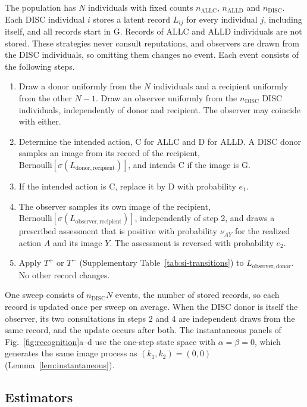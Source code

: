 \documentclass[10pt]{wlscirep}
\newcommand{\ALLC}{\mathrm{ALLC}}
\newcommand{\ALLD}{\mathrm{ALLD}}
\newcommand{\DISC}{\mathrm{DISC}}
\theoremstyle{plain}
\theoremstyle{remark}
\begin{document}
The population has $N$ individuals with fixed counts $n_{\ALLC}$, $n_{\ALLD}$ and $n_{\DISC}$. Each DISC individual $i$ stores a latent record $L_{ij}$ for every individual $j$, including itself, and all records start in G. Records of ALLC and ALLD individuals are not stored. These strategies never consult reputations, and observers are drawn from the DISC individuals, so omitting them changes no event. Each event consists of the following steps.
\begin{enumerate}
\item Draw a donor uniformly from the $N$ individuals and a recipient uniformly from the other $N-1$. Draw an observer uniformly from the $n_{\DISC}$ DISC individuals, independently of donor and recipient. The observer may coincide with either.
\item Determine the intended action, C for ALLC and D for ALLD. A DISC donor samples an image from its record of the recipient, $\mathrm{Bernoulli}[\sigma(L_{\mathrm{donor,recipient}})]$, and intends C if the image is G.
\item If the intended action is C, replace it by D with probability $e_1$.
\item The observer samples its own image of the recipient, $\mathrm{Bernoulli}[\sigma(L_{\mathrm{observer,recipient}})]$, independently of step 2, and draws a prescribed assessment that is positive with probability $\nu_{AY}$ for the realized action $A$ and its image $Y$. The assessment is reversed with probability $e_2$.
\item Apply $T^+$ or $T^-$ (Supplementary Table~\ref{tab:si-transitions}) to $L_{\mathrm{observer,donor}}$. No other record changes.
\end{enumerate}
One sweep consists of $n_{\DISC}N$ events, the number of stored records, so each record is updated once per sweep on average. When the DISC donor is itself the observer, its two consultations in steps 2 and 4 are independent draws from the same record, and the update occurs after both. The instantaneous panels of Fig.~\ref{fig:recognition}a--d use the one-step state space with $\alpha=\beta=0$, which generates the same image process as $(k_1,k_2)=(0,0)$ (Lemma~\ref{lem:instantaneous}).

\subsection{Estimators}
\end{document}
